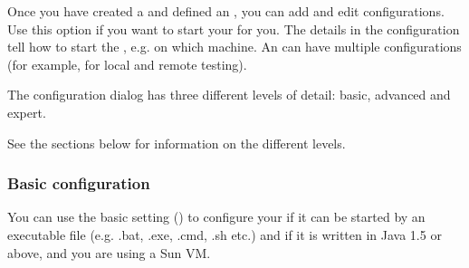 


Once you have created a \gdproject{}  and defined an \gdaut{} , you can add and edit \gdaut{} configurations. Use this option if you want \app{} to start your \gdaut{} for you. 
The details in the \gdaut{} configuration tell \app{} how to start the \gdaut{}, e.g. on which machine. 
An \gdaut{} can have multiple configurations (for example, for local and remote testing).  


The \gdaut{} configuration dialog has three different levels of detail: basic, advanced and expert. 

See the sections below for information on the different levels. 

\subsubsection{Basic \gdaut{} configuration}

You can use the basic setting () to configure your \gdaut{} if it can be started by an executable file (e.g. .bat, .exe, .cmd, .sh etc.) and if it is written in Java 1.5 or above, and you are using a Sun VM. 

